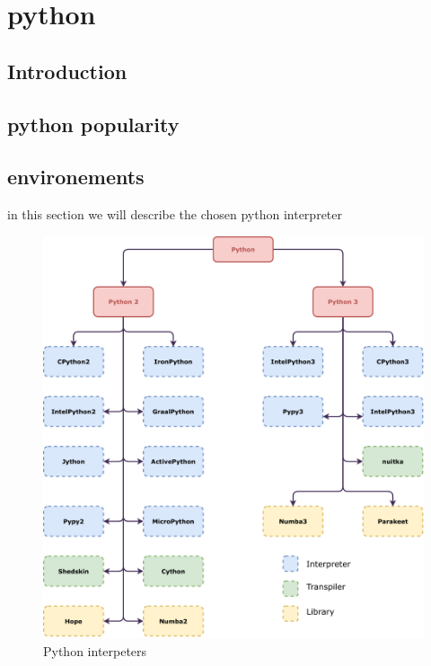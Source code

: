 \section{python}

\subsection{Introduction}

\subsection{python popularity}



\subsection{environements}
in this section we will describe the chosen python interpreter


\begin{figure}[thb]
    \centering
    \includegraphics[width=\linewidth]{imgs/python-implementations-tree}
    \caption{Python interpeters}
    \label{fig:interpreters}
\end{figure}


